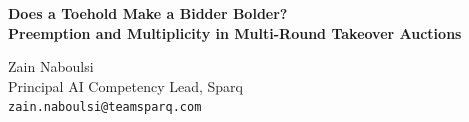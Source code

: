 \documentclass[11pt,a4paper]{article}
\begin{document}
\begin{center}
  {\LARGE\bfseries\color{sparqcoral}%
    Does a Toehold Make a Bidder Bolder?\\[0.3em]
    Preemption and Multiplicity in Multi-Round Takeover Auctions\par}
  \vspace{0.6em}
  {\large Zain Naboulsi}\\[0.3em]
  Principal AI Competency Lead, Sparq\\[0.2em]
  \texttt{zain.naboulsi@teamsparq.com}
\end{center}

\vspace{0.4em}
\end{document}
